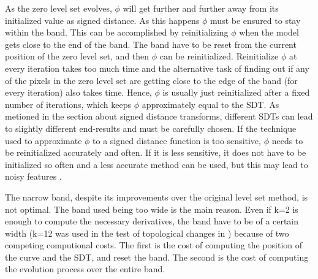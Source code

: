 As the zero level set evolves, \(\phi\) will get further and further away from its initialized value as signed distance. As this happens \(\phi\) must be ensured to stay within the band. This can be accomplished by reinitializing \(\phi\) when the model gets close to the end of the band. The band have to be reset from the current position of the zero level set, and then \(\phi\) can be reinitialized. Reinitialize \(\phi\) at every iteration takes too much time and the alternative task of finding out if any of the pixels in the zero level set are getting close to the edge of the band (for every iteration) also takes time. Hence, \(\phi\) is usually just reinitialized after a fixed number of iterations, which keeps \(\phi\) approximately equal to the SDT. As metioned in the section about signed distance transforms, different SDTs can lead to slightly different end-results and must be carefully chosen. If the technique used to approximate \(\phi\) to a signed distance function is too sensitive, \(\phi\) needs to be reinitialized accurately and often. If it is less sensitive, it does not have to be initialized so often and a less accurate method can be used, but this may lead to noisy features \cite{osher02}.

The narrow band, despite its improvements over the original level set method, is not optimal. The band used being too wide is the main reason. Even if k=2 is enough to compute the necessary derivatives, the band have to be of a certain width (k=12 was used in the test of topological changes in \cite{adalsteinsson94}) because of two competing computional costs\cite{whitaker89}. The first is the cost of computing the position of the curve and the SDT, and reset the band. The second is the cost of computing the evolution process over the entire band.
